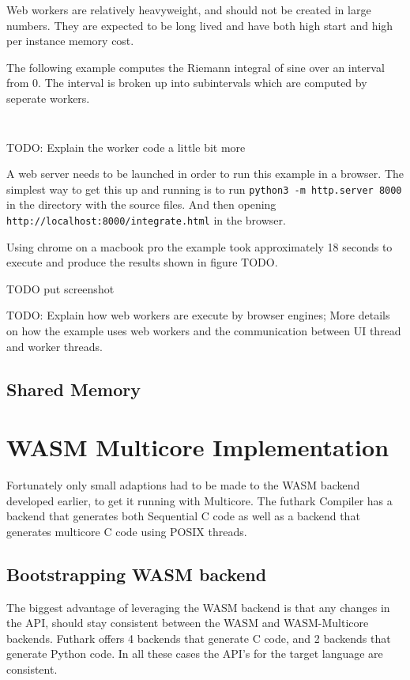 \documentclass[11pt]{article}
\begin{document}
Web workers are relatively heavyweight, and should not be created in large numbers. They are expected to be long lived and have both high start and high per instance memory cost. 

The following example computes the Riemann integral of sine over an interval from 0. The interval is broken up into subintervals which are computed by seperate workers.


\inputminted[fontsize=\small,baselinestretch=0.5,linenos]{html}{code/integrate.html}

\inputminted[fontsize=\small,baselinestretch=0.5,linenos]{javascript}{code/worker.js}

TODO: Explain the worker code a little bit more


A web server needs to be launched in order to run this example in a browser. The simplest way to get this up and running is to run \texttt{python3 -m http.server 8000} in the directory with the source files.  And then opening \texttt{http://localhost:8000/integrate.html} in the browser.

Using chrome on a macbook pro the example took approximately 18 seconds to execute and produce the results shown in figure TODO.

TODO put screenshot

TODO: Explain how web workers are execute by browser engines; More details on how the example uses web workers and the communication between UI thread and worker threads.


\subsection{Shared Memory}


\newpage

\section{WASM Multicore Implementation}



Fortunately only small adaptions had to be made to the WASM backend developed earlier, to get it running with Multicore. The futhark Compiler has a backend that generates both Sequential C code as well as a backend that generates multicore C code using POSIX threads. 


\subsection{Bootstrapping WASM backend}
The biggest advantage of leveraging the WASM backend is that any changes in the API, should stay consistent between the WASM and WASM-Multicore backends. Futhark offers 4 backends that generate C code, and 2 backends that generate Python code. In all these cases the API's for the target language are consistent. 
\end{document}
